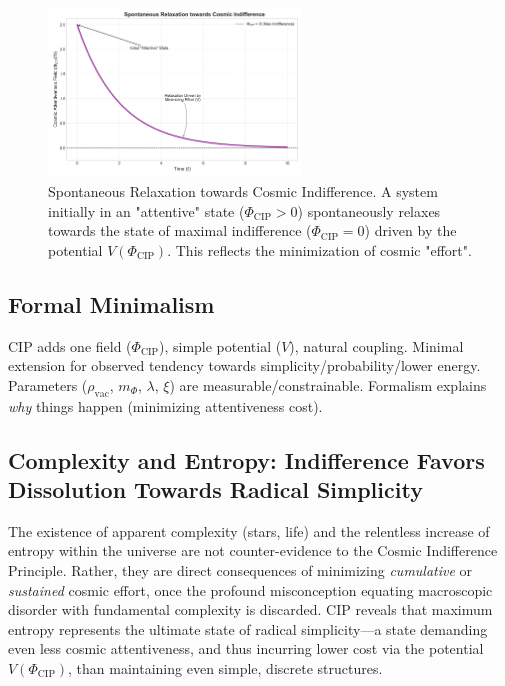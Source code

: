\documentclass[11pt, a4paper]{article}
\newcommand{\subt}[1]{\mathrm{#1}}
\begin{document}
\begin{figure}[htbp]
    \centering
    \includegraphics[width=0.6\textwidth]{CIP_Relaxation.png}
    \caption[Spontaneous Relaxation towards Cosmic Indifference]{Spontaneous Relaxation towards Cosmic Indifference. A system initially in an "attentive" state ($\Phi_{\subt{CIP}} > 0$) spontaneously relaxes towards the state of maximal indifference ($\Phi_{\subt{CIP}} = 0$) driven by the potential $V(\Phi_{\subt{CIP}})$. This reflects the minimization of cosmic "effort".}
    \label{fig:relaxation}
\end{figure}

\subsection{Formal Minimalism}

CIP adds one field ($\Phi_{\subt{CIP}}$), simple potential ($V$), natural coupling. Minimal extension for observed tendency towards simplicity/probability/lower energy. Parameters ($\rho_{\subt{vac}}$, $m_{\Phi}$, $\lambda$, $\xi$) are measurable/constrainable. Formalism explains \textit{why} things happen (minimizing attentiveness cost).

\subsection{Complexity and Entropy: Indifference Favors Dissolution Towards Radical Simplicity} \label{sec:entropy_complexity}

The existence of apparent complexity (stars, life) and the relentless increase of entropy within the universe are not counter-evidence to the Cosmic Indifference Principle. Rather, they are direct consequences of minimizing \textit{cumulative} or \textit{sustained} cosmic effort, once the profound misconception equating macroscopic disorder with fundamental complexity is discarded. CIP reveals that maximum entropy represents the ultimate state of radical simplicity—a state demanding even less cosmic attentiveness, and thus incurring lower cost via the potential $V(\Phi_{\subt{CIP}})$, than maintaining even simple, discrete structures.
\end{document}
